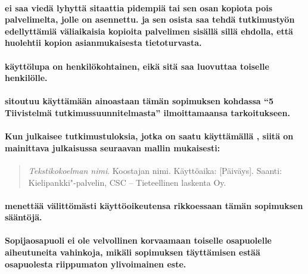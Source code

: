 \documentclass[a4paper,finnish]{article}
\begin{document}
\paragraph{ ei saa viedä lyhyttä sitaattia pidempiä
 tai sen osan kopiota pois palvelimelta, jolle
 on asennettu.  ja sen
osista saa tehdä tutkimustyön edellyttämiä väliaikaisia kopioita
palvelimen sisällä sillä ehdolla, että huolehtii kopion
asianmukaisesta tietoturvasta.}

\paragraph{ käyttölupa on henkilökohtainen,
eikä sitä saa luovuttaa toiselle henkilölle.}

\paragraph{ sitoutuu käyttämään
 ainoastaan tämän sopimuksen kohdassa
``5 Tiivistelmä tutkimussuunnitelmasta'' ilmoittamaansa
tarkoitukseen.}

\paragraph{Kun  julkaisee
tutkimustuloksia, jotka on saatu käyttämällä ,
siitä on mainittava julkaisussa seuraavan mallin mukaisesti:}

\begin{quote}
  {\em Tekstikokoelman nimi}. Koostajan nimi. Käyttöaika:
  [Päiväys]. Saanti: Kielipankki"-palvelin, CSC -- Tieteellinen laskenta
  Oy.
\end{quote}

\paragraph{ menettää välittömästi
käyttöoikeutensa rikkoessaan tämän sopimuksen sääntöjä.}

\paragraph{Sopijaosapuoli ei ole velvollinen korvaamaan toiselle
osapuolelle aiheutuneita vahinkoja, mikäli sopimuksen täyttämisen
estää osapuolesta riippumaton ylivoimainen este.}
\end{document}
